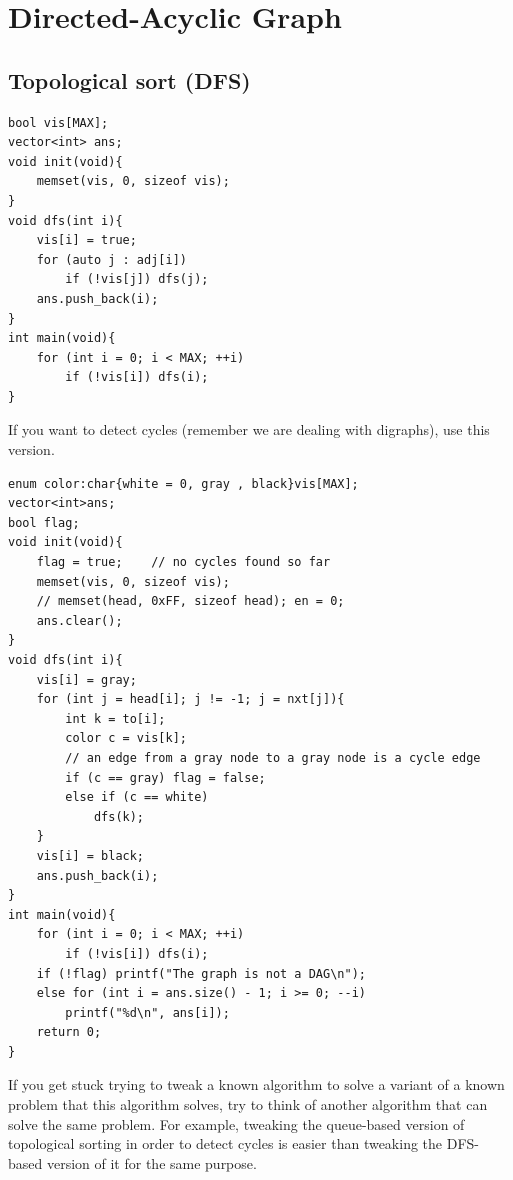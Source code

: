\documentclass[12pt]{book}
\begin{document}
\chapter{Directed-Acyclic Graph}
\section{Topological sort (DFS)}
\begin{verbatim}
bool vis[MAX];
vector<int> ans;
void init(void){
	memset(vis, 0, sizeof vis);
}
void dfs(int i){
	vis[i] = true;
	for (auto j : adj[i])
		if (!vis[j]) dfs(j);
	ans.push_back(i);
}
int main(void){
	for (int i = 0; i < MAX; ++i)
		if (!vis[i]) dfs(i);
}
\end{verbatim}
If you want to detect cycles (remember we are dealing with digraphs), use this version.
\begin{verbatim}
enum color:char{white = 0, gray , black}vis[MAX];
vector<int>ans;
bool flag;
void init(void){
	flag = true;	// no cycles found so far
	memset(vis, 0, sizeof vis);
	// memset(head, 0xFF, sizeof head); en = 0;
	ans.clear();
}
void dfs(int i){
	vis[i] = gray;
	for (int j = head[i]; j != -1; j = nxt[j]){
		int k = to[i];
		color c = vis[k];
		// an edge from a gray node to a gray node is a cycle edge
		if (c == gray) flag = false;
		else if (c == white)
			dfs(k);
	}
	vis[i] = black;
	ans.push_back(i);
}
int main(void){
	for (int i = 0; i < MAX; ++i)
		if (!vis[i]) dfs(i);
	if (!flag) printf("The graph is not a DAG\n");
	else for (int i = ans.size() - 1; i >= 0; --i)
		printf("%d\n", ans[i]);
	return 0;
}
\end{verbatim}
If you get stuck trying to tweak a known algorithm to solve a variant of a known problem that this algorithm solves, try to think of another algorithm that can solve the same problem. For example, tweaking the queue-based version of topological sorting in order to detect cycles is easier than tweaking the DFS-based version of it for the same purpose.
\end{document}
